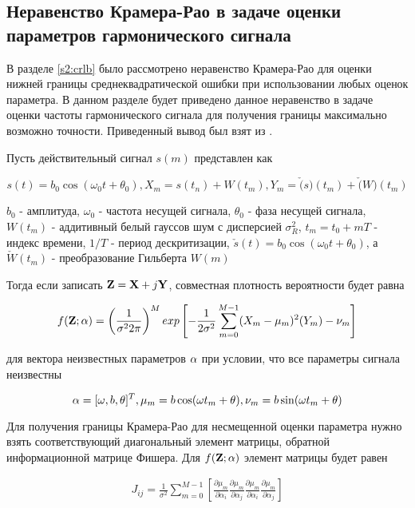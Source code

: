 \subsection{Неравенство Крамера-Рао в задаче оценки параметров гармонического сигнала}

В разделе \ref{s2:crlb} было рассмотрено неравенство Крамера-Рао для оценки нижней границы среднеквадратической ошибки
при использовании любых оценок параметра.
В данном разделе будет приведено данное неравенство в задаче оценки частоты
гармонического сигнала для получения границы максимально возможно точности. Приведенный вывод был взят из \cite{skon-clrb-report, rife-crlb-article}.

Пусть действительный сигнал ${s(m)}$ представлен как
\begin{center}
\begin{equation}
	\label{eq:crlb3_signal}
	s(t) = b_0 \cos(\omega_0 t + \theta_0),
	X_m = s(t_n) + W(t_m),
	Y_m = \check(s)(t_m) + \check(W)(t_m)
\end{equation}
\end{center}
${b_0}$ - амплитуда, ${\omega_0}$ - частота несущей сигнала, ${\theta_0}$ - фаза несущей сигнала, ${W(t_m)}$ - аддитивный белый гауссов шум
с дисперсией ${\sigma_R^2}$, ${t_m = t_0 + mT}$ - индекс времени, ${1/T}$ - период дескритизации,
${\check{s}(t) = b_0 \cos(\omega_0 t + \theta_0)}$, а ${\check{W}(t_m)}$ - преобразование Гильберта ${W(m)}$

Тогда если записать ${{\bf Z} = {\bf X} + j {\bf Y}}$, совместная плотность вероятности будет равна 
\begin{center}
\begin{equation}
	\label{eq:crlb3_gauss}
	f({\bf Z}; {\bf \alpha}) = \left( \frac{1}{\sigma^2 2 \pi} \right) ^M
		exp \left[ - \frac{1}{2 \sigma^2} \sum \limits_{m=0}^{M-1} (X_m - \mu_m)^2 (Y_m) - \nu_m \right]
\end{equation}
\end{center}

для вектора неизвестных параметров ${\bf \alpha}$ при условии, что все параметры сигнала неизвестны
\begin{center}
\begin{equation}
	\label{eq:crlb3_alpha}
	{\bf \alpha} = [\omega, b, \theta]^T,
	\mu_m = b \cos (\omega t_m + \theta),
	\nu_m = b \sin (\omega t_m + \theta)
\end{equation}
\end{center}

Для получения границы Крамера-Рао для несмещенной оценки параметра нужно взять соответствующий диагональный элемент
матрицы, обратной информационной матрице Фишера. Для ${f({\bf Z}; {\bf \alpha})}$ элемент матрицы будет равен
\begin{center}
\begin{eqnarray}
	\label{eq:crlb3_jacobi_ij}
	J_{ij} = \frac{1}{\sigma^2} \sum \limits_{m=0}^{M-1} 
	\left[
	\frac{\partial \mu_m}{\partial \alpha_i} \frac{\partial \mu_m}{\partial \alpha_j} \frac{\partial \mu_m}{\partial \alpha_i} \frac{\partial \mu_m}{\partial \alpha_j}
	\right]
\end{eqnarray}
\end{center}

